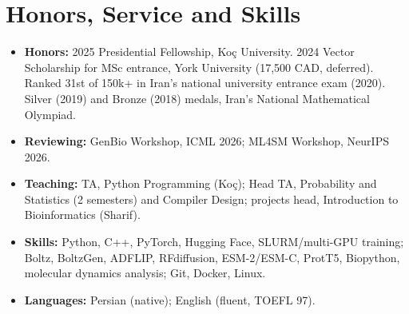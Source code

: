 \documentclass[letterpaper,10pt]{article}
\newcommand{\resumeItem}[1]{\item\small{#1\vspace{-3pt}}}
\newcommand{\resumeItemListStart}{\begin{itemize}[topsep=1pt, itemsep=0pt, parsep=0pt]}
\newcommand{\resumeItemListEnd}{\end{itemize}\vspace{-6pt}}
\begin{document}
\section{Honors, Service and Skills}
    \resumeItemListStart
        \resumeItem{\textbf{Honors:} 2025 Presidential Fellowship, Ko\c{c} University. 2024 Vector Scholarship for MSc entrance, York University (17,500 CAD, deferred). Ranked 31st of 150k+ in Iran's national university entrance exam (2020). Silver (2019) and Bronze (2018) medals, Iran's National Mathematical Olympiad.}
        \resumeItem{\textbf{Reviewing:} GenBio Workshop, ICML 2026; ML4SM Workshop, NeurIPS 2026.}
        \resumeItem{\textbf{Teaching:} TA, Python Programming (Ko\c{c}); Head TA, Probability and Statistics (2 semesters) and Compiler Design; projects head, Introduction to Bioinformatics (Sharif).}
        \resumeItem{\textbf{Skills:} Python, C++, PyTorch, Hugging Face, SLURM/multi-GPU training; Boltz, BoltzGen, ADFLIP, RFdiffusion, ESM-2/ESM-C, ProtT5, Biopython, molecular dynamics analysis; Git, Docker, Linux.}
        \resumeItem{\textbf{Languages:} Persian (native); English (fluent, TOEFL 97).}
    \resumeItemListEnd
\end{document}
